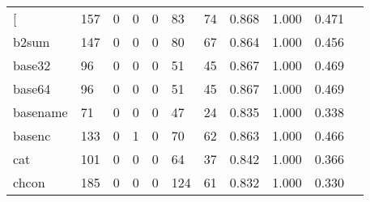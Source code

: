 \begin{longtable}{lp{1.10cm}p{1.10cm}p{1.10cm}p{1.10cm}p{1.10cm}p{1.10cm}p{1.10cm}p{1.10cm}p{1.10cm}p{1.10cm}}
\bottomrule
\endlastfoot
{[}         &                    157 &                                  0 &                                 0 &                                0 &                                83 &                              74 &                          0.868 &                                 1.000 &                               0.471 \\
b2sum     &                    147 &                                  0 &                                 0 &                                0 &                                80 &                              67 &                          0.864 &                                 1.000 &                               0.456 \\
base32    &                     96 &                                  0 &                                 0 &                                0 &                                51 &                              45 &                          0.867 &                                 1.000 &                               0.469 \\
base64    &                     96 &                                  0 &                                 0 &                                0 &                                51 &                              45 &                          0.867 &                                 1.000 &                               0.469 \\
basename  &                     71 &                                  0 &                                 0 &                                0 &                                47 &                              24 &                          0.835 &                                 1.000 &                               0.338 \\
basenc    &                    133 &                                  0 &                                 1 &                                0 &                                70 &                              62 &                          0.863 &                                 1.000 &                               0.466 \\
cat       &                    101 &                                  0 &                                 0 &                                0 &                                64 &                              37 &                          0.842 &                                 1.000 &                               0.366 \\
chcon     &                    185 &                                  0 &                                 0 &                                0 &                               124 &                              61 &                          0.832 &                                 1.000 &                               0.330 \\

\end{longtable}

